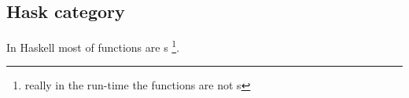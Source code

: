 




\subsection{\textbf{Hask} category}

In Haskell most of functions are s 
\footnote{really in the run-time the functions are not
  s}.  

